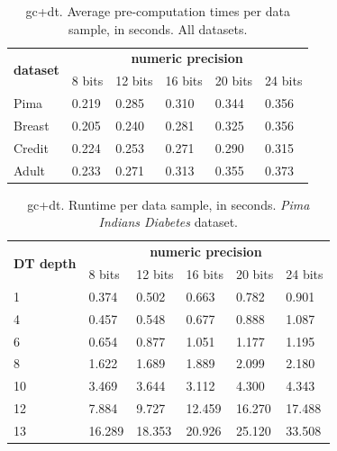 \begin{table}[htp]
\centering
\caption{\acs{gc}+\acs{dt}. Average pre-computation times per data sample, in seconds. All datasets.}
\label{table:avgDTAllDatasets}
\begin{tabular}{|l|l|l|l|l|l|}
\hline
\multicolumn{1}{|c|}{\multirow{2}{*}{\textbf{dataset}}} & \multicolumn{5}{c|}{\textbf{numeric precision}}                                             \\ \cline{2-6} 
\multicolumn{1}{|c|}{}                                  & 8 bits & 12 bits & 16 bits & 20 bits & 24 bits \\ \hline
Pima                                                    & 0.219           & 0.285            & 0.310            & 0.344            & 0.356            \\ \hline
Breast                                                  & 0.205           & 0.240            & 0.281            & 0.325            & 0.356            \\ \hline
Credit                                                  & 0.224           & 0.253            & 0.271            & 0.290            & 0.315            \\ \hline
Adult                                                   & 0.233           & 0.271            & 0.313            & 0.355            & 0.373            \\ \hline
\end{tabular}
\end{table}


\begin{table}[htp]
\centering
\caption{\acs{gc}+\acs{dt}. Runtime per data sample, in seconds. \emph{Pima Indians Diabetes} dataset.}
\label{table:runtimeDTPID}
\begin{tabular}{|l|l|l|l|l|l|}
\hline
\multirow{2}{*}{\textbf{DT depth}} & \multicolumn{5}{c|}{\textbf{numeric precision}}         \\ \cline{2-6} 
                          & 8 bits & 12 bits & 16 bits & 20 bits & 24 bits \\ \hline
1                         & 0.374  & 0.502   & 0.663   & 0.782   & 0.901   \\ \hline
4                         & 0.457  & 0.548   & 0.677   & 0.888   & 1.087   \\ \hline
6                         & 0.654  & 0.877   & 1.051   & 1.177   & 1.195   \\ \hline
8                         & 1.622  & 1.689   & 1.889   & 2.099   & 2.180   \\ \hline
10                        & 3.469  & 3.644   & 3.112   & 4.300   & 4.343   \\ \hline
12                        & 7.884  & 9.727   & 12.459  & 16.270  & 17.488  \\ \hline
13                        & 16.289 & 18.353  & 20.926  & 25.120  & 33.508  \\ \hline
\end{tabular}
\end{table}


